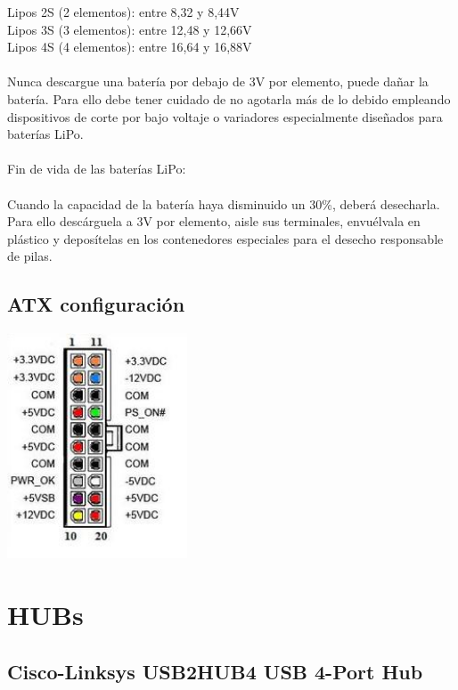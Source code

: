 \documentclass[a4paper]{book}
\begin{document}
    Lipos 2S (2 elementos): entre 8,32 y 8,44V\\
    Lipos 3S (3 elementos): entre 12,48 y 12,66V\\
    Lipos 4S (4 elementos): entre 16,64 y 16,88V\\
\\
Nunca descargue una batería por debajo de 3V por elemento, puede dañar la batería. Para ello debe tener cuidado de no 
agotarla más de lo debido empleando dispositivos de corte por bajo voltaje o variadores especialmente diseñados para 
baterías LiPo.\\
\\
Fin de vida de las baterías LiPo:\\
\\
Cuando la capacidad de la batería haya disminuido un 30\%, deberá desecharla. Para ello descárguela a 3V por elemento, 
aisle sus terminales, envuélvala en plástico y deposítelas en los contenedores especiales para el desecho responsable de 
pilas.\\

\subsection{ATX configuración}
\begin{center}
\includegraphics[width=0.4\textwidth]{Figures/Hardware/Partes/ATX.JPG}
\label{fig:Hardware:Partes:Microfono:ATX}
\end{center}

\section{HUBs}

\subsection{Cisco-Linksys USB2HUB4 USB 4-Port Hub}
\end{document}
